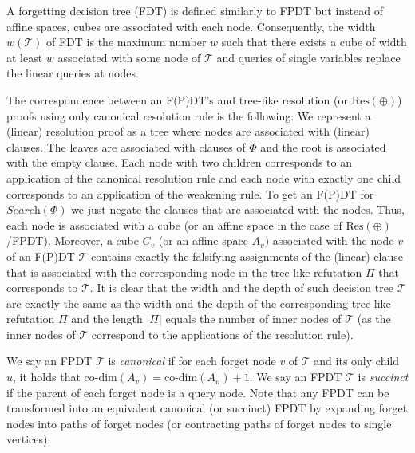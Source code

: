 \documentclass[10pt,a4paper]{article}
\begin{document}
A forgetting decision tree (FDT) is defined similarly to FPDT but instead of affine spaces, cubes are associated with each node.
Consequently, the width $w(\mathcal{T})$ of FDT is the maximum number $w$ such that there exists a cube of width at least $w$ associated with some node of $\mathcal{T}$ and queries of single variables replace the linear queries at nodes.\par




The correspondence between an F(P)DT’s and tree-like resolution (or $\text{Res}(\oplus)$) proofs using only canonical resolution rule is the following:
We represent a (linear) resolution proof as a tree where nodes are associated with (linear) clauses.
The leaves are associated with clauses of $\Phi$ and the root is associated with the empty clause.
Each node with two children corresponds to an application of the canonical resolution rule and each node with exactly one child corresponds to an application of the weakening rule.
To get an F(P)DT for $\textit{Search}(\Phi)$ we just negate the clauses that are associated with the nodes.
Thus, each node is associated with a cube (or an affine space in the case of $\text{Res}(\oplus)$/FPDT).
Moreover, a cube $C_{v}$ (or an affine space $A_{v})$ associated with the node $v$ of an F(P)DT $\mathcal{T}$ contains exactly the falsifying assignments of the (linear) clause that is associated with the corresponding node in the tree-like refutation $\Pi$ that corresponds to $\mathcal{T}$.
It is clear that the width and the depth of such decision tree $\mathcal{T}$ are exactly the same as the width and the depth of the corresponding tree-like refutation $\Pi$ and the length $|\Pi|$ equals the number of inner nodes of $\mathcal{T}$ (as the inner nodes of $\mathcal{T}$ correspond to the applications of the resolution rule).\par




We say an FPDT $\mathcal{T}$ is \emph{canonical} if for each forget node $v$ of $\mathcal{T}$ and its only child $u$, it holds that $\text{co-dim}(A_{v})=\text{co-dim}(A_{u})+1$.
We say an FPDT $\mathcal{T}$ is \emph{succinct} if the parent of each forget node is a query node.
Note that any FPDT can be transformed into an equivalent canonical (or succinct) FPDT by expanding forget nodes into paths of forget nodes (or contracting paths of forget nodes to single vertices).\par
\end{document}
